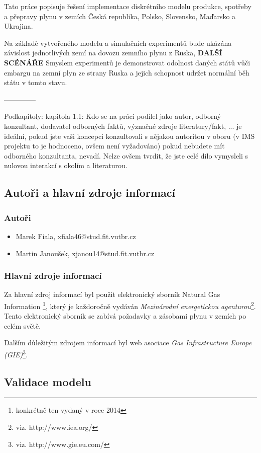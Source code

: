 \documentclass[a4paper,11pt]{article}
\begin{document}
Tato práce popisuje řešení implementace diskrétního modelu produkce, spotřeby a přepravy plynu v zemích Česká republika, Polsko, Slovensko, Maďarsko a Ukrajina.


Na základě vytvořeného modelu a simulačních experimentů bude ukázána závislost jednotlivých zemí na dovozu zemního plynu z Ruska, \textbf{DALŠÍ SCÉNÁŘE}
Smyslem experimentů je demonstrovat odolnost daných států vůči embargu na zemní plyn ze strany Ruska a jejich schopnost udržet normální běh státu v tomto stavu.

\vline

--------------

Podkapitoly:
kapitola 1.1: Kdo se na práci podílel jako autor, odborný konzultant, dodavatel odborných faktů, význačné zdroje literatury/fakt, ...
je ideální, pokud jste vaši koncepci konzultovali s nějakou autoritou v oboru (v IMS projektu to je hodnoceno, ovšem není vyžadováno)
pokud nebudete mít odborného konzultanta, nevadí. Nelze ovšem tvrdit, že jste celé dílo vymysleli s nulovou interakcí s okolím a literaturou.

\subsection{Autoři a hlavní zdroje informací}
\subsubsection{Autoři}
\begin{itemize}
\item Marek Fiala, xfiala46@stud.fit.vutbr.cz
\item Martin Janoušek, xjanou14@stud.fit.vutbr.cz
\end{itemize}

\subsubsection{Hlavní zdroje informací}
Za hlavní zdroj informací byl použit elektronický sborník Natural Gas Information \cite{IEA}\footnote{konkrétně ten vydaný v roce 2014},
který je každoročně vydáván \textit{Mezinárodní energetickou agenturou}\footnote{viz. http://www.iea.org/}.
Tento elektronický sborník se zabívá požadavky a zásobami plynu v zemích po celém světě.


Dalším důležitým zdrojem informací byl web asociace \textit{Gas Infrastructure Europe (GIE)}\footnote{viz. http://www.gie.eu.com/}.


\subsection{Validace modelu}
\end{document}
